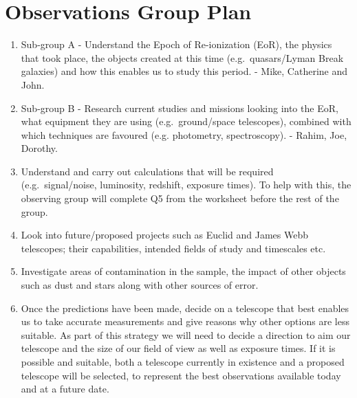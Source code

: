 \section{Observations Group Plan}
\begin{enumerate}
	\item Sub-group A - Understand the Epoch of Re-ionization (EoR), the physics that took place, the objects created at this time (e.g.\ quasars/Lyman Break galaxies) and how this enables us to study this period. - Mike, Catherine and John.

	\item Sub-group B - Research current studies and missions looking into the EoR, what equipment they are using (e.g.\ ground/space telescopes), combined with which techniques are favoured (e.g. photometry, spectroscopy). - Rahim, Joe, Dorothy.

	\item Understand and carry out calculations that will be required (e.g.\ signal/noise, luminosity, redshift, exposure times). To help with this, the observing group will complete Q5 from the worksheet before the rest of the group.

	\item Look into future/proposed projects such as Euclid and James Webb telescopes; their capabilities, intended fields of study and timescales etc.

	\item Investigate areas of contamination in the sample, the impact of other objects such as dust and stars along with other sources of error.

	\item Once the predictions have been made, decide on a telescope that best enables us to take accurate measurements and give reasons why other options are less suitable. As part of this strategy we will need to decide a direction to aim our telescope and the size of our field of view as well as exposure times. If it is possible and suitable, both a telescope currently in existence and a proposed telescope will be selected, to represent the best observations available today and at a future date.
\end{enumerate}

